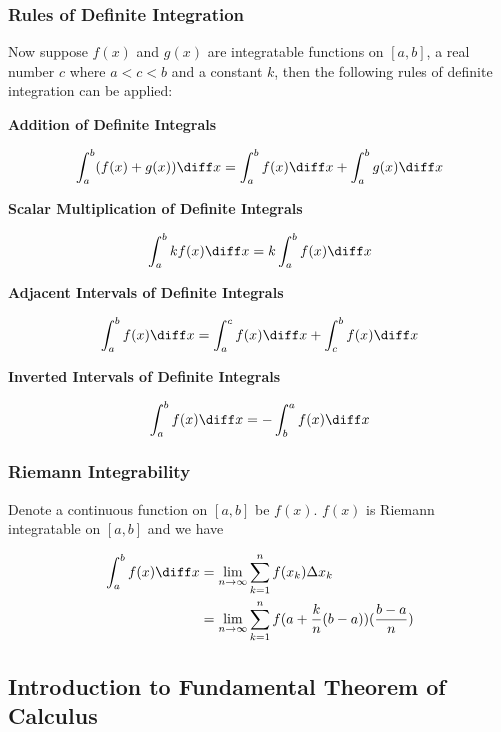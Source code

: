 \subsubsection{Rules of Definite Integration}
\begin{thm}
  Now suppose $f(x)$ and $g(x)$ are integratable functions on $[a,b]$, a real number $c$ where $a<c<b$ and a constant $k$, then the following rules of definite integration can be applied:

  \begin{alist}
    \item \textbf{Addition of Definite Integrals}

    $$\int_{a}^{b}(f(x)+g(x))\diff x=\int_{a}^{b}f(x)\diff x+\int_{a}^{b}g(x)\diff x$$

    \item \textbf{Scalar Multiplication of Definite Integrals}

    $$\int_{a}^{b}kf(x)\diff x=k\int_{a}^{b}f(x)\diff x$$

    \item \textbf{Adjacent Intervals of Definite Integrals}

    $$\int_{a}^{b}f(x)\diff x=\int_{a}^{c}f(x)\diff x+\int_{c}^{b}f(x)\diff x$$

    \item \textbf{Inverted Intervals of Definite Integrals}

    $$\int_{a}^{b}f(x)\diff x=-\int_{b}^{a}f(x)\diff x$$
  \end{alist}
\end{thm}

\subsubsection{Riemann Integrability}
\begin{thm}
  Denote a continuous function on $[a,b]$ be $f(x)$. $f(x)$ is Riemann integratable on $[a,b]$ and we have

  $$\begin{aligned}[t]
    \int_{a}^{b}f(x)\diff x&=\lim_{n\to\infty}\sum_{k=1}^{n}f(x_{k})\Delta x_{k}\\
    &=\lim_{n\to\infty}\sum_{k=1}^{n}f(a+\frac{k}{n}(b-a))(\frac{b-a}{n})
  \end{aligned}$$
\end{thm}

\subsection{Introduction to Fundamental Theorem of Calculus}
